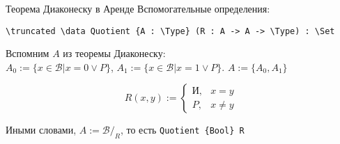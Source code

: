 \documentclass[aspectratio=169,dvipsnames,usenames]{beamer}
\begin{document}
\begin{frame}[fragile]{Теорема Диаконеску в Аренде}
Вспомогательные определения:

\begin{verbatim}
\truncated \data Quotient {A : \Type} (R : A -> A -> \Type) : \Set
\end{verbatim}

Вспомним $A$ из теоремы Диаконеску:\\
$A_0 := \{ x \in \mathcal{B} | x = 0 \vee P \}$, $A_1 := \{ x \in \mathcal{B} | x = 1 \vee P\}$.
$A := \{A_0,A_1\}$

$$R(x,y) := \left\{\begin{array}{ll}\text{И},&x = y\\
                                    P,&x \ne y\end{array}\right.
$$

Иными словами, $A := \mathcal{B}/_R$, то есть \verb!Quotient {Bool} R!
\end{frame}

\end{document}
